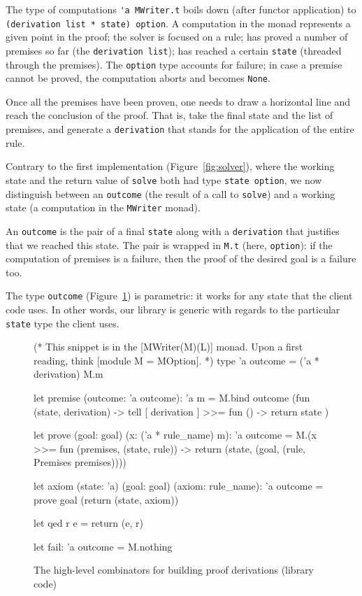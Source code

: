 \documentclass{easychair}
\def\li{\lstinline}
\newcommand{\fref}[1]{Figure~\ref{fig:#1}}
\begin{document}
The type of computations \li+'a MWriter.t+ boils down (after functor
application) to \li+(derivation list * state) option+. A computation in the monad
represents a given point in the proof; the solver is focused on a rule; has
proved a number of premises so far (the \li+derivation list+); has reached a
certain \li+state+ (threaded through the premises). The \li+option+ type
accounts for failure; in case a premise cannot be proved, the computation aborts
and becomes \li+None+.

Once all the premises have been proven, one needs to draw a horizontal line and
reach the conclusion of the proof. That is, take the final state and the list of
premises, and generate a \li+derivation+ that stands for the application of the
entire rule.

Contrary to the first implementation (\fref{solver}), where the working state
and the return value of \li+solve+ both had type \li+state option+, we now
distinguish between an \li+outcome+ (the result of a call to \li+solve+) and a
working state (a computation in the \li+MWriter+ monad).

An \li+outcome+ is the pair of a final \li+state+ along
with a \li+derivation+ that justifies that we reached this state. The pair is
wrapped in \li+M.t+ (here, \li+option+): if the computation of premises is a
failure, then the proof of the desired goal is a failure too.

The type \li+outcome+ (\fref{combinators}) is parametric: it works for any
state that the client code uses. In other words, our library is generic with
regards to the particular \li+state+ type the client uses.

\begin{figure}
  \centering
\begin{ocaml}
(* This snippet is in the [MWriter(M)(L)] monad. Upon a first reading, think
   [module M = MOption]. *)
type 'a outcome = ('a * derivation) M.m

let premise (outcome: 'a outcome): 'a m =
  M.bind outcome (fun (state, derivation) ->
    tell [ derivation ] >>= fun () ->
    return state
  )

let prove (goal: goal) (x: ('a * rule_name) m): 'a outcome =
  M.(x >>= fun (premises, (state, rule)) ->
    return (state, (goal, (rule, Premises premises))))

let axiom (state: 'a) (goal: goal) (axiom: rule_name): 'a outcome =
  prove goal (return (state, axiom))

let qed r e =
  return (e, r)

let fail: 'a outcome =
  M.nothing
\end{ocaml}
  \caption{The high-level combinators for building proof derivations (library
  code)}
  \label{fig:combinators}
\end{figure}
\end{document}
